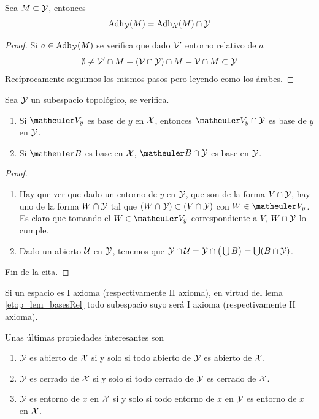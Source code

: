 \begin{prop}
	Sea $M \subset \mathcal{Y}$, entonces \[\operatorname{\mathrm{Adh}}_{\mathcal{Y}}(M)=\operatorname{\mathrm{Adh}}_{\mathcal{X}}(M)\cap\mathcal{Y}\]
\end{prop}
\begin{proof}
	Si $a \in \operatorname{\mathrm{Adh}}_{\mathcal{Y}}(M)$ se verifica que dado $\mathcal{V}'$ entorno relativo de $a$
	\[\emptyset\not=\mathcal{V}' \cap M = (\mathcal{V}\cap\mathcal{Y})\cap M = \mathcal{V} \cap M\subset\mathcal{Y}\]
	Recíprocamente seguimos los mismos pasos pero leyendo como los árabes.
\end{proof}
\begin{lem}
	\label{etop_lem_basesRel}
	Sea $\mathcal{Y}$ un subespacio topológico, se verifica.
	\begin{enumerate}
		\item Si $\Va{y}$ es base de $y$ en $\mathcal{X}$, entonces $\Va{y} \cap \Y$ es base de $y$ en $\mathcal{Y}$.
		\item Si $\B$ es base en $\mathcal{X}$, $\B \cap \Y$ es base en $\mathcal{Y}$.
	\end{enumerate}
\end{lem}
\begin{proof}
	\begin{enumerate}
		\item Hay que ver que dado un entorno de $y$ en $\mathcal{Y}$, que son de la forma $V \cap \mathcal{Y}$, hay uno de la forma $W \cap \mathcal{Y}$ tal que $(W \cap \mathcal{Y}) \subset (V \cap \mathcal{Y})$ con $W\in\Va{y}$. Es claro que tomando el $W\in\Va{y}$ correspondiente a $V$, $W \cap \mathcal{Y}$ lo cumple.
		\item Dado un abierto $\mathcal{U}$ en $\mathcal{Y}$, tenemos que $\mathcal{Y} \cap \mathcal{U} = \mathcal{Y} \cap \big( \bigcup B \big) = \bigcup (B \cap \mathcal{Y})$.
	\end{enumerate}
	Fin de la cita.
\end{proof}
\begin{obs}
	\label{etop_obs_axiomasHereditarios}
	Si un espacio es I axioma (respectivamente II axioma), en virtud del lema \ref{etop_lem_basesRel} todo subespacio suyo será I axioma (respectivamente II axioma).
\end{obs}
\begin{lem}
	\label{etop_lem_otrasProp}
	Unas últimas propiedades interesantes son
	\begin{enumerate}
		\item $\mathcal{Y}$ es abierto de $\mathcal{X}$ si y solo si todo abierto de $\mathcal{Y}$ es abierto de $\mathcal{X}$.
		\item $\mathcal{Y}$ es cerrado de $\mathcal{X}$ si y solo si todo cerrado de $\mathcal{Y}$ es cerrado de $\mathcal{X}$.
		\item $\mathcal{Y}$ es entorno de $x$ en $\mathcal{X}$ si y solo si todo entorno de $x$ en $\mathcal{Y}$ es entorno de $x$ en $\mathcal{X}$.
	\end{enumerate}
\end{lem}
